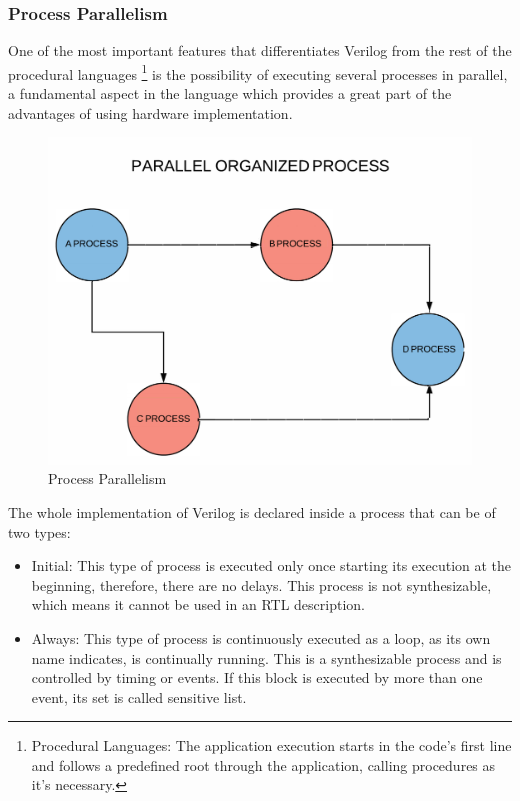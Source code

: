 \subsubsection{Process Parallelism}
One of the most important features that differentiates Verilog from the rest of the procedural languages \footnote{Procedural Languages: The application execution starts in the code’s first line and follows a predefined root through the application, calling procedures as it’s necessary.} is the possibility of executing several processes in parallel, a fundamental aspect in the language which provides a great part of the advantages of using hardware implementation.

\begin{center}
	\begin{figure}[H]
		\center
		\includegraphics[trim = 0mm 0mm 0mm 0mm, clip,scale=0.3]{imagenes/EstadoArte/procesos_paralelo.pdf}
		\caption{Process Parallelism}
		\label{fig:procesos_paralelo}
	\end{figure}
	
\end{center}
The whole implementation of Verilog is declared inside a process that can be of two types:
\begin{itemize}
		\item Initial: This type of process is executed only once starting its execution at the beginning, therefore, there are no delays. This process is not synthesizable, which means it cannot be used in an RTL description.
		
		\item Always: This type of process is continuously executed as a loop, as its own name indicates, is continually running. This is a synthesizable process and is controlled by timing or events. If this block is executed by more than one event, its set is called sensitive list.
\end{itemize}

